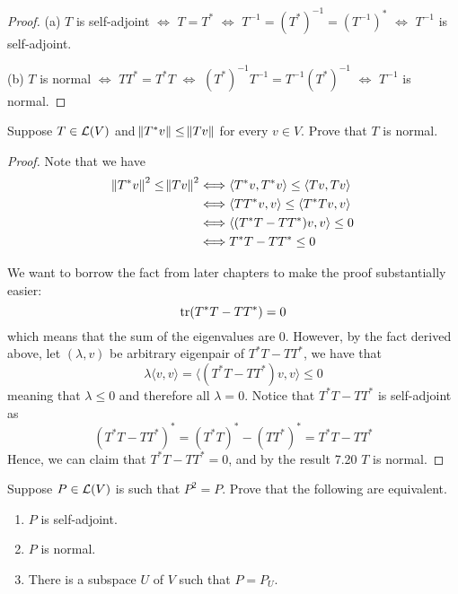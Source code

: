 \documentclass{extarticle}
\begin{document}
\begin{proof}
(a) \(T\) is self-adjoint \(\Longleftrightarrow\) \(T = T^*\) \(\Longleftrightarrow\) \(T^{-1} = (T^*)^{-1} = (T^{-1})^*\)
\(\Longleftrightarrow\) \(T^{-1}\) is self-adjoint. 

(b) \(T\) is normal \(\Longleftrightarrow\) \(TT^* = T^*T\) \(\Longleftrightarrow\)
\((T^*)^{-1}T^{-1} = T^{-1}(T^*)^{-1}\) \(\Longleftrightarrow\) \(T^{-1}\) is normal.
\end{proof}

\begin{problem}{19}
    Suppose \(T \in \mathcal{L}(V)\) and \(\norm{T^* v} \leq \norm{Tv}\) for every \(v \in V\). Prove that 
    \(T\) is normal.
\end{problem}

\begin{proof}

Note that we have 
\begin{align*}
    \norm{T^* v}^2 \leq \norm{T v}^2
    &\Longleftrightarrow \langle T^*v,T^* v \rangle \leq \langle Tv,Tv \rangle \\ 
    &\Longleftrightarrow \langle TT^*v,v \rangle \leq \langle T^* Tv,v \rangle \\ 
    &\Longleftrightarrow \langle (T^*T - TT^*)v,v \rangle \leq 0 \\ 
    &\Longleftrightarrow T^* T - TT^* \leq 0
\end{align*}

We want to borrow the fact from later chapters to make the proof substantially easier: 
\[\text{tr}(T^* T - TT^*) = 0 \]
which means that the sum of the eigenvalues are 0. However, by the fact derived above, let 
\((\lambda, v)\) be arbitrary eigenpair of \(T^* T - TT^*\), we have that 
\[\lambda \langle v,v \rangle = \langle (T^* T - TT^* )v,v \rangle \leq 0\]
meaning that \(\lambda \leq 0\) and therefore all \(\lambda = 0\). Notice that 
\(T^*T - TT^*\) is self-adjoint as 
\[(T^*T - TT^*)^* = (T^* T)^* - (TT^*)^* = T^* T - TT^*\]
Hence, we can claim that \(T^* T - TT^* = 0\), and by the result 7.20 \(T\) is normal.
\end{proof}

\begin{problem}{20}
    Suppose \(P \in \mathcal{L}(V)\) is such that \(P^2 = P\). Prove that the following are equivalent. 
    \begin{enumerate}[label=(\alph*)]
        \item \(P\) is self-adjoint. 
        \item \(P\) is normal. 
        \item There is a subspace \(U\) of \(V\) such that \(P = P_U\). 
    \end{enumerate}
\end{problem}
\end{document}
